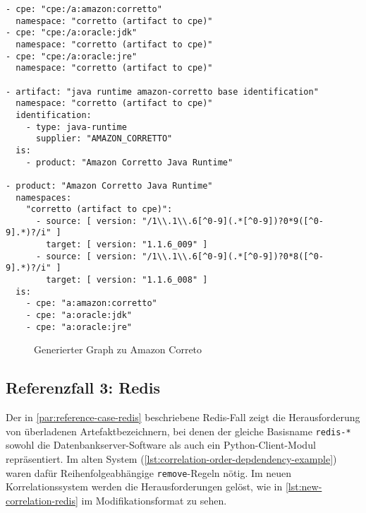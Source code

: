 \begin{lstlisting}[style=yaml,caption={Produktmodellierung zu Amazon Correto},label={lst:new-correlation-java-runtimes},basicstyle=\ttfamily\scriptsize]
- cpe: "cpe:/a:amazon:corretto"
  namespace: "corretto (artifact to cpe)"
- cpe: "cpe:/a:oracle:jdk"
  namespace: "corretto (artifact to cpe)"
- cpe: "cpe:/a:oracle:jre"
  namespace: "corretto (artifact to cpe)"

- artifact: "java runtime amazon-corretto base identification"
  namespace: "corretto (artifact to cpe)"
  identification:
    - type: java-runtime
      supplier: "AMAZON_CORRETTO"
  is:
    - product: "Amazon Corretto Java Runtime"

- product: "Amazon Corretto Java Runtime"
  namespaces:
    "corretto (artifact to cpe)":
      - source: [ version: "/1\\.1\\.6[^0-9](.*[^0-9])?0*9([^0-9].*)?/i" ]
        target: [ version: "1.1.6_009" ]
      - source: [ version: "/1\\.1\\.6[^0-9](.*[^0-9])?0*8([^0-9].*)?/i" ]
        target: [ version: "1.1.6_008" ]
  is:
    - cpe: "a:amazon:corretto"
    - cpe: "a:oracle:jdk"
    - cpe: "a:oracle:jre"
\end{lstlisting}

\begin{figure}[htbp]
    \centering
    \makebox[\textwidth]{}
    \caption{Generierter Graph zu Amazon Correto}
    \label{fig:example-graph-java-runtimes}
\end{figure}

\subsection{Referenzfall 3: Redis}\label{subsec:example-redis}

Der in \autoref{par:reference-case-redis} beschriebene Redis-Fall zeigt die Herausforderung von überladenen Artefaktbezeichnern, bei denen der gleiche Basisname \texttt{redis-*} sowohl die Datenbankserver-Software als auch ein Python-Client-Modul repräsentiert.
Im alten System (\autoref{lst:correlation-order-depdendency-example}) waren dafür Reihenfolgeabhängige \texttt{remove}-Regeln nötig.
Im neuen Korrelationssystem werden die Herausforderungen gelöst, wie in \autoref{lst:new-correlation-redis} im Modifikationsformat zu sehen.

